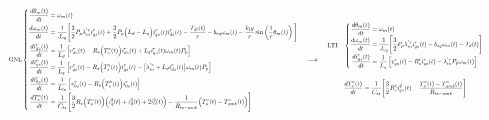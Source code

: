 \documentclass[blue,fullpaper]{ludusofficial}  %
\begin{document}
\[
\resizebox{\textwidth}{!}{$\displaystyle
    \text{GNL} 
    \begin{cases}
        \begin{aligned} 
            \frac{d\theta_m(t)}{dt} & = \omega_m(t) \\
            \frac{d\omega_{m}(t)}{dt} & = \frac{1}{J_{eq}} \Bigg[ \frac{3}{2}P_{p} \lambda_{m}^{'r} i_{qs}^{r}(t) + \frac{3}{2} P_{p} \Big( L_{d} - L_{q} \Big) i_{qs}^{r}(t) i_{ds}^{r}(t)  - \frac{T_{dl}(t)}{r} - b_{eq}  \omega_{m}(t) - \frac{k_{l}g}{r} \sin \left(  \frac{1}{r} \theta_{m}(t) \right) \Bigg]  \\
            \frac{di_{ds}^{r}(t)}{dt} & = \frac{1}{L_{d}} \left[ v_{ds}^{r}(t) - R_{s} \Big( T_{s}^{\circ} (t) \Big) i_{ds}^{r}(t) + L_{q}i_{qs}^{r}(t) \omega_{m}(t)P_{p}  \right] \label{variacion_ids} \\
            \frac{di_{qs}^{r}(t)}{dt}  & = \frac{1}{L_{q} } \left[ v_{qs}^{r}(t) - R_{s} \Big( T_{s}^{\circ} (t) \Big) i_{qs}^{r}(t) - \big[ \lambda_{m}^{'r} + L_{d} i_{ds}^{r}(t) \big] \omega_{m}(t)P_{p} \right]  \\
            \frac{di_{0s}^{r}(t)}{dt} & = \frac{1}{ L_{ls} } \left[ v_{0s}^{r}(t) - R_{s} \Big( T_{s}^{\circ} (t) \Big) i_{0s}^{r}(t) \right] \\
            \frac{dT_{s}^{\circ}(t)}{dt} & = \frac{1}{C_{ts}} \Bigg[ \frac{3}{2} R_{s}\Big( T_{s}^{\circ}(t) \Big) \Big( i_{q}^{2}(t) + i_{d}^{2}(t) + 2i_{0}^{2}(t) \Big) - \frac{1}{R_{ts-amb}} \Big( T_{s}^{\circ}(t) - T_{amb}^{\circ}(t) \Big) \Bigg]
        \end{aligned}
    \end{cases} 
    \implies \quad
    \begin{aligned}
        \text{LTI} \quad & 
        \begin{cases}
            \begin{aligned}
                \frac{d\theta_m(t)}{dt} & = \omega_m(t) \\
                \frac{d\omega_{m}(t)}{dt} & = \frac{1}{J_{eq}} \Bigg[ \frac{3}{2}P_{p} \lambda_{m}^{'r} i_{qs}^{r}(t) - b_{eq}  \omega_{m}(t) - T_{d}(t) \Bigg]  \\
                \frac{di_{qs}^{r}(t)}{dt}  & = \frac{1}{L_{q} } \left[ v_{qs}^{r}(t) - R_{s}^{\ell} i_{qs}^{r}(t) - \lambda_{m}^{'r}P_{p} \omega_{m}(t) \right]
            \end{aligned}
        \end{cases} \\[4mm]
        & \frac{dT_{s}^{\circ}(t)}{dt} = \frac{1}{C_{ts}} \Bigg[ \frac{3}{2} R_{s}^{\ell}i_{qs}^{2}(t)  - \frac{T_{s}^{\circ}(t) - T_{amb}^{\circ}(t)}{R_{ts-amb}} \Bigg]
    \end{aligned}
$}
\]
\end{document}
